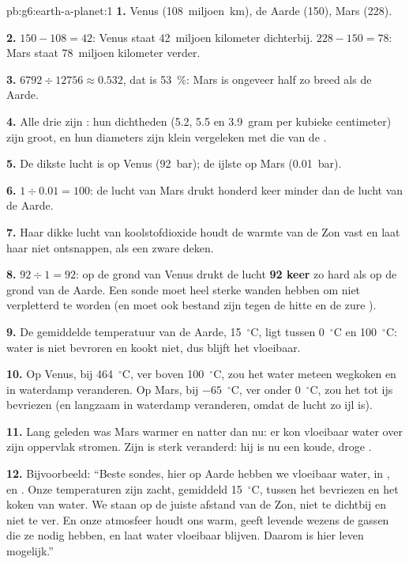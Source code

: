 \begin{solution}{pb:g6:earth-a-planet:1}
\textbf{1.} Venus (108~miljoen~km), de Aarde (150), Mars (228).

\textbf{2.} $150 - 108 = 42$: Venus staat 42~miljoen kilometer dichterbij.
$228 - 150 = 78$: Mars staat 78~miljoen kilometer verder.

\textbf{3.} $6792 \div 12756 \approx 0.532$, dat is 53~\%: Mars is ongeveer
half zo breed als de Aarde.

\textbf{4.} Alle drie zijn : hun dichtheden (5.2, 5.5 en
3.9~gram per kubieke centimeter) zijn groot, en hun diameters zijn klein
vergeleken met die van de .

\textbf{5.} De dikste lucht is op Venus (92~bar); de ijlste op Mars
(0.01~bar).

\textbf{6.} $1 \div 0.01 = 100$: de lucht van Mars drukt honderd keer minder
dan de lucht van de Aarde.

\textbf{7.} Haar dikke lucht van koolstofdioxide houdt de warmte van de Zon
vast en laat haar niet ontsnappen, als een zware deken.

\textbf{8.} $92 \div 1 = 92$: op de grond van Venus drukt de lucht
\textbf{92 keer} zo hard als op de grond van de Aarde. Een sonde moet heel
sterke wanden hebben om niet verpletterd te worden (en moet ook bestand
zijn tegen de hitte en de zure ).

\textbf{9.} De gemiddelde temperatuur van de Aarde, 15~$^\circ$C, ligt
tussen 0~$^\circ$C en 100~$^\circ$C: water is niet bevroren en kookt niet,
dus blijft het vloeibaar.

\textbf{10.} Op Venus, bij 464~$^\circ$C, ver boven 100~$^\circ$C, zou het
water meteen wegkoken en in waterdamp veranderen. Op Mars, bij
$-65$~$^\circ$C, ver onder 0~$^\circ$C, zou het tot ijs bevriezen (en
langzaam in waterdamp veranderen, omdat de lucht zo ijl is).

\textbf{11.} Lang geleden was Mars warmer en natter dan nu: er kon vloeibaar
water over zijn oppervlak stromen. Zijn  is sterk veranderd: hij is
nu een koude, droge .

\textbf{12.} Bijvoorbeeld: ``Beste sondes, hier op Aarde hebben we
vloeibaar water, in ,  en . Onze temperaturen zijn
zacht, gemiddeld 15~$^\circ$C, tussen het bevriezen en het koken van water.
We staan op de juiste afstand van de Zon, niet te dichtbij en niet te ver.
En onze atmosfeer houdt ons warm, geeft levende wezens de gassen die ze
nodig hebben, en laat water vloeibaar blijven. Daarom is hier leven
mogelijk.''
\end{solution}
